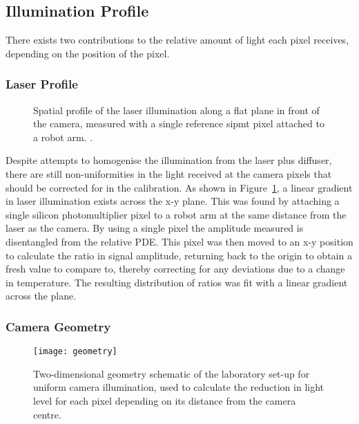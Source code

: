 \subsection{Illumination Profile} \label{section:illumination_profile}

There exists two contributions to the relative amount of light each pixel receives, depending on the position of the pixel.

\subsubsection{Laser Profile}

\begin{figure}
	\centering
	\caption[Lab laser profile]{Spatial profile of the laser illumination along a flat plane in front of the camera, measured with a single reference \gls{sipmt} pixel attached to a robot arm. .}
	\label{fig:light_profile}
\end{figure}

Despite attempts to homogenise the illumination from the laser plus diffuser, there are still non-uniformities in the light received at the camera pixels that should be corrected for in the calibration. As shown in Figure~\ref{fig:light_profile}, a linear gradient in laser illumination exists across the x-y plane. This was found by attaching a single silicon photomultiplier pixel to a robot arm at the same distance from the laser as the camera. By using a single pixel the amplitude measured is disentangled from the relative PDE. This pixel was then moved to an x-y position to calculate the ratio in signal amplitude, returning back to the origin to obtain a fresh value to compare to, thereby correcting for any deviations due to a change in temperature. The resulting distribution of ratios was fit with a linear gradient across the plane.

\subsubsection{Camera Geometry}

\begin{figure}
	\centering
    \texttt{[image: geometry]} 
	\caption[Camera geometry correction schematic]{Two-dimensional geometry schematic of the laboratory set-up for uniform camera illumination, used to calculate the reduction in light level for each pixel depending on its distance from the camera centre.}
	\label{fig:geometry}
\end{figure}

